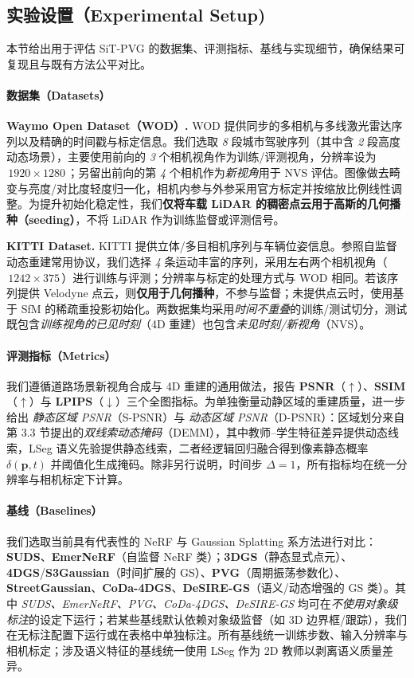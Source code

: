 \documentclass[10pt,conference]{IEEEtran} %
\begin{document}
\subsection{实验设置（Experimental Setup)}
本节给出用于评估 SiT\mbox{-}PVG 的数据集、评测指标、基线与实现细节，确保结果可复现且与既有方法公平对比。

\paragraph{数据集（Datasets）}
\textbf{Waymo Open Dataset（WOD）.} WOD 提供同步的多相机与多线激光雷达序列以及精确的时间戳与标定信息。我们选取 \emph{8} 段城市驾驶序列（其中含 \emph{2} 段高度动态场景），主要使用前向的 \emph{3} 个相机视角作为训练/评测视角，分辨率设为 \(\,1920\times 1280\,\)；另留出前向的第 \emph{4} 个相机作为\emph{新视角}用于 NVS 评估。图像做去畸变与亮度/对比度轻度归一化，相机内参与外参采用官方标定并按缩放比例线性调整。为提升初始化稳定性，我们\textbf{仅将车载 LiDAR 的稠密点云用于高斯的几何播种（seeding）}，不将 LiDAR 作为训练监督或评测信号。

\textbf{KITTI Dataset.} KITTI 提供立体/多目相机序列与车辆位姿信息。参照自监督动态重建常用协议，我们选择 \emph{4} 条运动丰富的序列，采用左右两个相机视角（\(\,1242\times 375\,\)）进行训练与评测；分辨率与标定的处理方式与 WOD 相同。若该序列提供 Velodyne 点云，则\textbf{仅用于几何播种}，不参与监督；未提供点云时，使用基于 SfM 的稀疏重投影初始化。两数据集均采用\emph{时间不重叠}的训练/测试切分，测试既包含\emph{训练视角的已见时刻}（4D 重建）也包含\emph{未见时刻/新视角}（NVS）。

\paragraph{评测指标（Metrics）}
我们遵循道路场景新视角合成与 4D 重建的通用做法，报告 \textbf{PSNR}（\(\uparrow\)）、\textbf{SSIM}（\(\uparrow\)）与 \textbf{LPIPS}（\(\downarrow\)）三个全图指标。为单独衡量动静区域的重建质量，进一步给出 \emph{静态区域 PSNR}（S\mbox{-}PSNR）与 \emph{动态区域 PSNR}（D\mbox{-}PSNR）：区域划分来自第 3.3 节提出的\emph{双线索动态掩码}（DEMM），其中教师–学生特征差异提供动态线索，LSeg 语义先验提供静态线索，二者经逻辑回归融合得到像素静态概率 \(\delta(\mathbf p,t)\) 并阈值化生成掩码。除非另行说明，时间步 \(\Delta{=}1\)，所有指标均在统一分辨率与相机标定下计算。

\paragraph{基线（Baselines）}
我们选取当前具有代表性的 NeRF 与 Gaussian Splatting 系方法进行对比：\textbf{SUDS}、\textbf{EmerNeRF}（自监督 NeRF 类）；\textbf{3DGS}（静态显式点元）、\textbf{4DGS}/\textbf{S3Gaussian}（时间扩展的 GS）、\textbf{PVG}（周期振荡参数化）、\textbf{StreetGaussian}、\textbf{CoDa\mbox{-}4DGS}、\textbf{DeSIRE\mbox{-}GS}（语义/动态增强的 GS 类）。其中 \emph{SUDS、EmerNeRF、PVG、CoDa\mbox{-}4DGS、DeSIRE\mbox{-}GS} 均可在\emph{不使用对象级标注}的设定下运行；若某些基线默认依赖对象级监督（如 3D 边界框/跟踪），我们在无标注配置下运行或在表格中单独标注。所有基线统一训练步数、输入分辨率与相机标定；涉及语义特征的基线统一使用 LSeg 作为 2D 教师以剥离语义质量差异。
\end{document}
